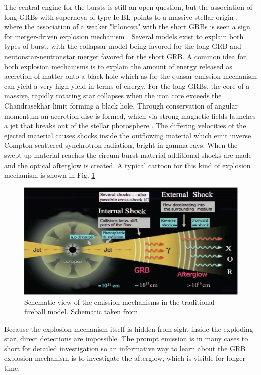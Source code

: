 The central engine for the bursts is still an open question, but the association of long GRBs with supernova of type Ic-BL points to a massive stellar origin \citep{Woosley2006, Hjorth2013}, where the association of a weaker "kilonova" with the short GRBs is seen a sign for merger-driven explosion mechanism \citep{Tanvir2013}. Several models exist to explain both types of burst, with the collapsar-model being favored for the long GRB and neutonstar-neutronstar merger favored for the short GRB. A common idea for both explosion mechanisms is to explain the amount of energy released as accretion of matter onto a black hole which as for the quasar emission mechanism can yield a very high yield in terms of energy. For the long GRBs, the core of a massive, rapidly rotating star collapses when the iron core exceeds the Chandrasekhar limit forming a black hole. Through conservation of angular momentum an accretion disc is formed, which via strong magnetic fields launches a jet that breaks out of the stellar photosphere \citep{Woosley2006a}. The differing velocities of the ejected material causes shocks inside the outflowing material which emit inverse Compton-scattered synchrotron-radiation, bright in gamma-rays.  When the swept-up material reaches the circum-burst material additional shocks are made and the optical afterglow is created. A typical cartoon for this kind of explosion mechanism is shown in Fig. \ref{fig:intro:grbglow}


\begin{figure}[htb]
	\includegraphics[width=\textwidth]{gfx/grbmec}
	\caption{Schematic view of the emission mechanisms in the traditional fireball model. Schematic taken from \citet{Meszaros2014}}
	\label{fig:intro:grbglow}
\end{figure}

Because the explosion mechanism itself is hidden from sight inside the exploding star, direct detections are impossible. The prompt emission is in many cases to short for detailed investigation so an informative way to learn about the GRB explosion mechanism is to investigate the afterglow, which is visible for longer time. 




